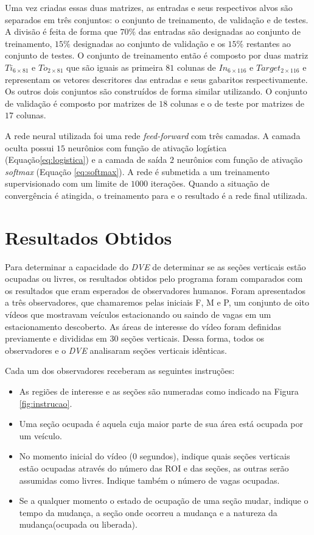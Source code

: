 Uma vez criadas essas duas matrizes, as entradas e seus respectivos alvos são separados em três conjuntos: o conjunto de treinamento, de validação e de testes. A divisão é feita de forma que $70\%$ das entradas são designadas ao conjunto de treinamento, $15\%$ designadas ao conjunto de validação e os $15\%$ restantes ao conjunto de testes. O conjunto de treinamento então é composto por duas matriz $Ti_{6\times 81}$ e $To_{2\times 81}$ que são iguais as primeira $81$ colunas de $In_{6\times 116}$ e $Target_{2\times 116}$ e representam os vetores descritores das entradas e seus gabaritos respectivamente. Os outros dois conjuntos são construídos de forma similar utilizando. O conjunto de validação é composto por matrizes de $18$ colunas e o de teste por matrizes de $17$ colunas.


A rede neural utilizada foi uma rede \textit{feed-forward} com três camadas. A camada oculta possui $15$ neurônios com função de ativação logística (Equação\ref{eq:logistica}) e a camada de saída $2$ neurônios com função de ativação \textit{softmax} (Equação \ref{eq:softmax}). A rede é submetida a um treinamento supervisionado com um limite de $1000$ iterações. Quando a situação de convergência é atingida, o treinamento para e o resultado é a rede final utilizada.


\section{Resultados Obtidos}

Para determinar a capacidade do \textit{DVE} de determinar se as seções verticais estão ocupadas ou livres, os resultados obtidos pelo programa foram comparados com os resultados que eram esperados de observadores humanos. Foram apresentados a três observadores, que chamaremos pelas iniciais F, M e P, um conjunto de oito vídeos que mostravam veículos estacionando ou saindo de vagas em um estacionamento descoberto. As áreas de interesse do vídeo foram definidas previamente e divididas em $30$ seções verticais. Dessa forma, todos os observadores e o \textit{DVE} analisaram seções verticais idênticas. 

Cada um dos observadores receberam as seguintes instruções:

\begin{itemize}
  \item As regiões de interesse e as seções são numeradas como indicado na Figura \ref{fig:instrucao}.
	\item Uma seção ocupada é aquela cuja maior parte de sua área está ocupada por um veículo.
	\item No momento inicial do vídeo ($0$ segundos), indique quais seções verticais estão ocupadas através do número das ROI e das seções, as outras serão assumidas como livres. Indique também o número de vagas ocupadas.
	\item Se a qualquer momento o estado de ocupação de uma seção mudar, indique o tempo da mudança, a seção onde ocorreu a mudança e a natureza da mudança(ocupada ou liberada).
\end{itemize}

